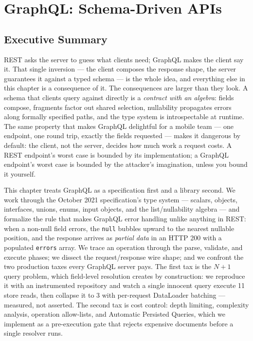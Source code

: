 \chapter{GraphQL: Schema-Driven APIs}
\label{ch:graphql}

\section*{Executive Summary}

REST asks the server to guess what clients need; GraphQL makes the client
say it. That single inversion --- the client composes the response shape,
the server guarantees it against a typed schema --- is the whole idea, and
everything else in this chapter is a consequence of it. The consequences
are larger than they look. A schema that clients query against directly is
a \emph{contract with an algebra}: fields compose, fragments factor out
shared selection, nullability propagates errors along formally specified
paths, and the type system is introspectable at runtime. The same property
that makes GraphQL delightful for a mobile team --- one endpoint, one
round trip, exactly the fields requested --- makes it dangerous by
default: the client, not the server, decides how much work a request
costs. A REST endpoint's worst case is bounded by its implementation; a
GraphQL endpoint's worst case is bounded by the attacker's imagination,
unless you bound it yourself.

This chapter treats GraphQL as a specification first and a library second.
We work through the October 2021 specification's type system \cite{graphqlspec}
--- scalars, objects, interfaces, unions, enums, input objects, and the
list/nullability algebra --- and formalize the rule that makes GraphQL
error handling unlike anything in REST: when a non-null field errors, the
\texttt{null} bubbles upward to the nearest nullable position, and the
response arrives as \emph{partial data} in an HTTP 200 with a populated
\texttt{errors} array. We trace an operation through the parse, validate,
and execute phases; we dissect the request/response wire shape; and we
confront the two production taxes every GraphQL server pays. The first tax
is the $N{+}1$ query problem, which field-level resolution creates by
construction: we reproduce it with an instrumented repository and watch a
single innocent query execute 11 store reads, then collapse it to 3 with
per-request DataLoader batching --- measured, not asserted. The second tax
is cost control: depth limiting, complexity analysis, operation
allow-lists, and Automatic Persisted Queries, which we implement as a
pre-execution gate that rejects expensive documents before a single
resolver runs.

